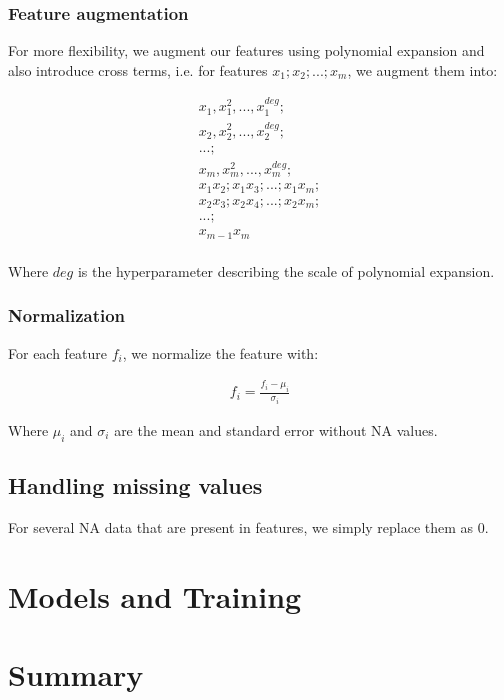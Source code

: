 \documentclass[10pt,conference,compsocconf]{IEEEtran}
\begin{document}
\subsubsection{Feature augmentation}
For more flexibility, we augment our features using polynomial expansion and also introduce cross terms, i.e. for features $x_1; x_2; ...; x_m$, we augment them into: 

\begin{center}
\begin{gather*}
{x_1, x_1^2, ... , x_1^{deg};} \\
{x_2}, x_2^2, ..., x_2^{deg}; \\
...; \\
x_m, x_m^2, ..., x_m^{deg}; \\
x_1x_2; x_1x_3; ...; x_1x_m; \\
x_2x_3; x_2x_4; ...; x_2x_m; \\
...; \\
x_{m-1}x_m \\
\end{gather*}
\end{center}
Where $deg$ is the hyperparameter describing the scale of polynomial expansion.

\subsubsection{Normalization}
For each feature $f_i$, we normalize the feature with:
\begin{center}
\begin{gather*}
f_i = \frac{f_i - \mu_i}{\sigma_i}
\end {gather*}
\end{center}
Where $\mu_i$ and $\sigma_i$ are the mean and standard error without NA values.

\subsection{Handling missing values}
For several NA data that are present in features, we simply replace them as 0.

\section{Models and Training}



\section{Summary}
\end{document}
